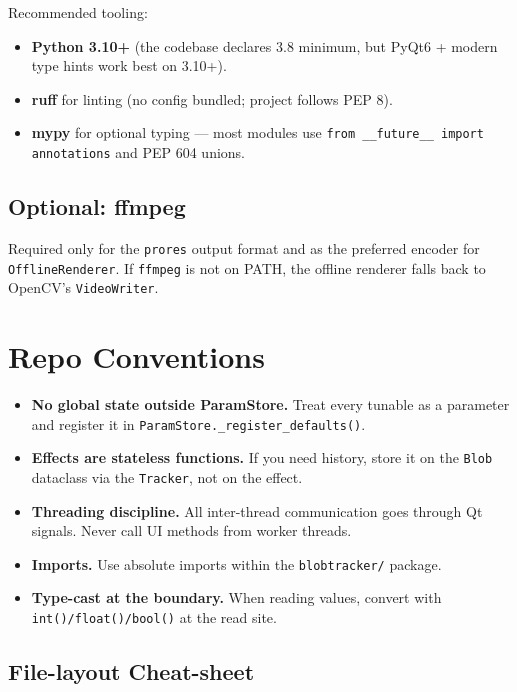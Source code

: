 \documentclass[11pt,a4paper,openany]{report}
\begin{document}
Recommended tooling:

\begin{itemize}
    \item \textbf{Python 3.10+} (the codebase declares 3.8 minimum, but
        PyQt6 + modern type hints work best on 3.10+).
    \item \textbf{ruff} for linting (no config bundled; project follows
        PEP 8).
    \item \textbf{mypy} for optional typing --- most modules use
        \texttt{from \_\_future\_\_ import annotations} and PEP 604 unions.
\end{itemize}

\subsection{Optional: ffmpeg}

Required only for the \texttt{prores} output format and as the preferred
encoder for \texttt{OfflineRenderer}. If \texttt{ffmpeg} is not on PATH, the
offline renderer falls back to OpenCV's \texttt{VideoWriter}.

\section{Repo Conventions}

\begin{itemize}
    \item \textbf{No global state outside ParamStore.} Treat every tunable
        as a parameter and register it in
        \texttt{ParamStore.\_register\_defaults()}.
    \item \textbf{Effects are stateless functions.} If you need history,
        store it on the \texttt{Blob} dataclass via the \texttt{Tracker},
        not on the effect.
    \item \textbf{Threading discipline.} All inter-thread communication
        goes through Qt signals. Never call UI methods from worker threads.
    \item \textbf{Imports.} Use absolute imports within the
        \texttt{blobtracker/} package.
    \item \textbf{Type-cast at the boundary.} When reading values, convert
        with \texttt{int()/float()/bool()} at the read site.
\end{itemize}

\subsection{File-layout Cheat-sheet}
\end{document}

